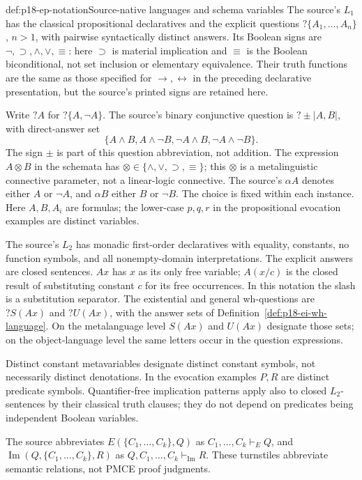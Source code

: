 \begin{hbdefinition}{def:p18-ep-notation}{Source-native languages and schema variables}
The source's \(L_1\) has the classical propositional declaratives and the
explicit questions \(?\{A_1,\ldots,A_n\}\), \(n>1\), with pairwise
syntactically distinct answers. Its Boolean signs are
\(\neg,\supset,\land,\lor,\equiv\): here \(\supset\) is material
implication and \(\equiv\) is the Boolean biconditional, not set inclusion
or elementary equivalence. Their truth functions are the same as those
specified for \(\to,\leftrightarrow\) in the preceding declarative
presentation, but the source's printed signs are retained here.

Write \(?A\) for \(?\{A,\neg A\}\). The source's binary conjunctive
question is \(?\pm|A,B|\), with direct-answer set
\[
 \{A\land B,A\land\neg B,\neg A\land B,\neg A\land\neg B\}.
\]
The sign \(\pm\) is part of this question abbreviation, not addition.
The expression \(A\otimes B\) in the schemata has
\(\otimes\in\{\land,\lor,\supset,\equiv\}\); this \(\otimes\)
is a metalinguistic connective parameter, not a linear-logic connective.
The source's \(\alpha A\) denotes either \(A\) or \(\neg A\), and
\(\alpha B\) either \(B\) or \(\neg B\). The choice is fixed within
each instance. Here \(A,B,A_i\) are formulas; the lower-case
\(p,q,r\) in the propositional evocation examples are distinct variables.

The source's \(L_2\) has monadic first-order declaratives with equality,
constants, no function symbols, and all nonempty-domain interpretations.
The explicit answers are closed sentences. \(Ax\) has \(x\) as its only
free variable; \(A(x/c)\) is the closed result of substituting constant
\(c\) for its free occurrences. In this notation the slash is a
substitution separator. The existential and general wh-questions are
\(?S(Ax)\) and \(?U(Ax)\), with the answer sets of
Definition~\ref{def:p18-ei-wh-language}. On the metalanguage level
\(S(Ax)\) and \(U(Ax)\) designate those sets; on the object-language
level the same letters occur in the question expressions.

Distinct constant metavariables designate distinct constant symbols, not
necessarily distinct denotations. In the evocation examples \(P,R\) are
distinct predicate symbols. Quantifier-free implication patterns apply
also to closed \(L_2\)-sentences by their classical truth clauses; they
do not depend on predicates being independent Boolean variables.

The source abbreviates \(E(\{C_1,\ldots,C_k\},Q)\) as
\(C_1,\ldots,C_k\vdash_E Q\), and
\(\operatorname{Im}(Q,\{C_1,\ldots,C_k\},R)\) as
\(Q,C_1,\ldots,C_k\vdash_{\operatorname{Im}}R\).
These turnstiles abbreviate semantic relations, not PMCE proof judgments.
\end{hbdefinition}

